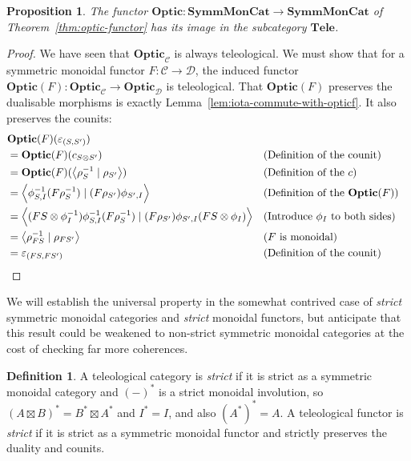 \documentclass[11pt,letterpaper]{article}
\theoremstyle{plain}
\newtheorem{proposition}[theorem]{Proposition}
\theoremstyle{definition}
\newtheorem{definition}[theorem]{Definition}
\newcommand{\C}{\mathscr{C}}
\newcommand{\D}{\mathscr{D}}
\newcommand{\SymmMonCat}{\mathbf{SymmMonCat}}
\newcommand{\Tele}{\mathbf{Tele}}
\newcommand{\Optic}{\mathbf{Optic}}
\newcommand{\teletimes}{\mathbin{\boxtimes}}
\newcommand{\rep}[2]{{\ensuremath \left\langle #1 \mid #2 \right\rangle}}
\begin{document}
\begin{proposition}
  The functor $\Optic : \SymmMonCat \to \SymmMonCat$ of Theorem~\ref{thm:optic-functor} has its image in the subcategory $\Tele$.
\end{proposition}
\begin{proof}
 We have seen that $\Optic_\C$ is always teleological. We must show that for a symmetric monoidal functor $F : \C \to \D$, the induced functor $\Optic(F) : \Optic_\C \to \Optic_\D$ is teleological. That $\Optic(F)$ preserves the dualisable morphisms is exactly Lemma~\ref{lem:iota-commute-with-opticf}. It also preserves the counits:
  \begin{align*}
    &\Optic(F)(\varepsilon_{(S, S')})  \\
    &= \Optic(F)(c_{S \otimes S'}) && \text{(Definition of the counit)} \\
    &= \Optic(F)(\rep{\rho_S^{-1}}{\rho_{S'}}) && \text{(Definition of the $c$)} \\
    &= \rep{\phi^{-1}_{S,I} (F \rho_S^{-1})}{(F \rho_{S'}) \phi_{S',I}}&& \text{(Definition of the $\Optic(F)$)} \\ 
    &= \rep{(FS \otimes \phi_I^{-1}) \phi^{-1}_{S,I} (F \rho_S^{-1})}{(F \rho_{S'}) \phi_{S',I} (FS \otimes \phi_I)} && \text{(Introduce $\phi_I$ to both sides)} \\
    &= \rep{\rho_{FS}^{-1}}{\rho_{FS'}} && \text{($F$ is monoidal)} \\
    &= \varepsilon_{(FS, FS')} && \text{(Definition of the counit)}
  \end{align*}

\end{proof}

We will establish the universal property in the somewhat contrived case of \emph{strict} symmetric monoidal categories and \emph{strict} monoidal functors, but anticipate that this result could be weakened to non-strict symmetric monoidal categories at the cost of checking far more coherences.

\begin{definition}
A teleological category is \emph{strict} if it is strict as a symmetric monoidal category and ${(-)}^*$ is a strict monoidal involution, so ${(A \teletimes B)}^* = B^* \teletimes A^*$ and $I^* = I$, and also ${(A^*)}^* = A$. A teleological functor is \emph{strict} if it is strict as a symmetric monoidal functor and strictly preserves the duality and counits.
\end{definition}
\end{document}
